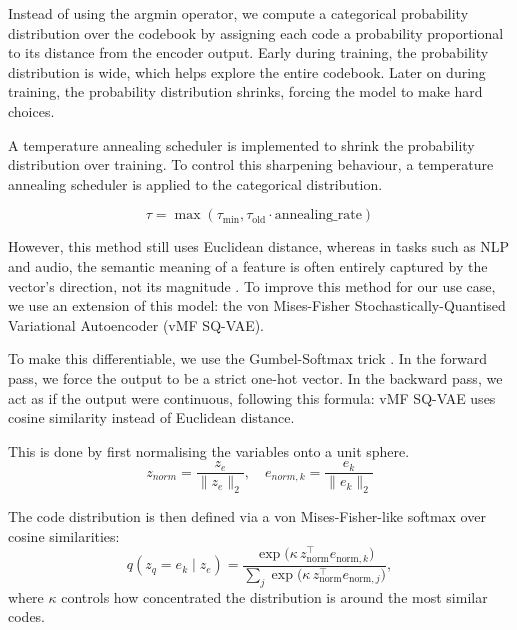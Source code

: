 

Instead of using the argmin operator, we compute a categorical probability distribution over the codebook by assigning each code a probability proportional to its distance from the encoder output.
Early during training, the probability distribution is wide, which helps explore the entire codebook.
Later on during training, the probability distribution shrinks, forcing the model to make hard choices.

A temperature annealing scheduler is implemented to shrink the probability distribution over training.
To control this sharpening behaviour, a temperature annealing scheduler is applied to the categorical distribution.

\begin{equation}
    \tau = \max(\tau_{\min}, \tau_{\text{old}} \cdot \text{annealing\_rate})
\end{equation}

However, this method still uses Euclidean distance, whereas in tasks such as NLP and audio, the semantic meaning of a feature is often entirely captured by the vector's direction, not its magnitude \cite{semantic-direction}.
To improve this method for our use case, we use an extension of this model: the von Mises-Fisher Stochastically-Quantised Variational Autoencoder (vMF SQ-VAE).

To make this differentiable, we use the Gumbel-Softmax trick \cite{gumbel, gumbel2}.
In the forward pass, we force the output to be a strict one-hot vector.
In the backward pass, we act as if the output were continuous, following this formula:
vMF SQ-VAE uses cosine similarity instead of Euclidean distance.

This is done by first normalising the variables onto a unit sphere.
\begin{equation}
    z_{norm} = \frac{z_e}{\|z_e\|_2}, \quad e_{norm, k} = \frac{e_k}{\|e_k\|_2}
\end{equation}

The code distribution is then defined via a von Mises-Fisher-like softmax over cosine similarities:
\begin{equation}
    q(z_q = e_k \mid z_e) = \frac{\exp\big(\kappa \, z_{\text{norm}}^\top e_{\text{norm},k}\big)}{\sum_j \exp\big(\kappa \, z_{\text{norm}}^\top e_{\text{norm},j}\big)},
    \label{eqn:gumbel-softmax}
\end{equation}
where \(\kappa\) controls how concentrated the distribution is around the most similar codes.

